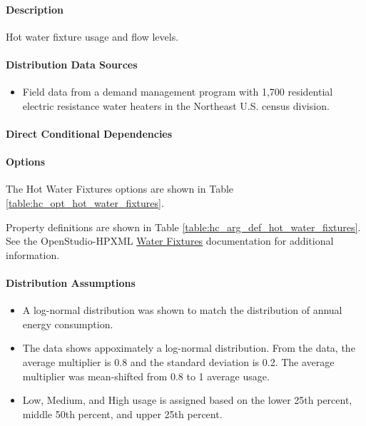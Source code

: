 \paragraph{Description}
% 
Hot water fixture usage and flow levels.

\paragraph{Distribution Data Sources}
% 
\begin{itemize}
\item
  Field data from a demand management program with 1,700 residential
  electric resistance water heaters in the Northeast U.S. census division.
\end{itemize}

\paragraph{Direct Conditional Dependencies}


\paragraph{Options}
The Hot Water Fixtures options are shown in Table \ref{table:hc_opt_hot_water_fixtures}.



Property definitions are shown in Table \ref{table:hc_arg_def_hot_water_fixtures}. See the OpenStudio-HPXML \href{https://openstudio-hpxml.readthedocs.io/en/v1.10.0/workflow_inputs.html#hpxml-water-fixtures}{Water Fixtures} documentation for additional information.



\paragraph{Distribution Assumptions}
% 
\begin{itemize}
\item
  A log-normal distribution was shown to match the distribution of annual
  energy consumption.
\item
  The data shows appoximately a log-normal distribution. From the data, the average multiplier is 0.8 and the
  standard deviation is 0.2. The average multiplier was mean-shifted from 0.8 to 1 average usage.
\item
  Low, Medium, and High usage is assigned based on the lower 25th
  percent, middle 50th percent, and upper 25th percent.
\end{itemize}
